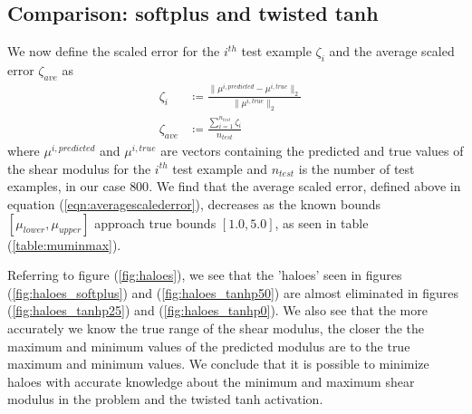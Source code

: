 \documentclass[12pt]{article}
\begin{document}
\subsection{\label{sect:compsofttanh} Comparison: softplus and twisted tanh}
We now define the scaled error for the $i^{th}$  test example $\zeta_{i}$ and the average scaled error $\zeta_{ave}$ as
\begin{subequations}
  \begin{align}
  \zeta_{i} &\coloneqq \frac{\|\mu^{i,predicted} - \mu^{i,true}\|_{2}}{\|\mu^{i,true}\|_{2}}  &\label{eqn:scalederror}\\
  \zeta_{ave} &\coloneqq \frac{\sum_{i=1}^{n_{test}}\zeta_{i}}{n_{test}} &\label{eqn:averagescalederror}
  \end{align}
\end{subequations}
where $\mu^{i,predicted}$ and $\mu^{i,true}$ are vectors containing the predicted and true values of the shear modulus for the $i^{th}$ test example and $n_{test}$ is the number of test examples, in our case $800$. We find that the average scaled error, defined above in equation (\ref{eqn:averagescalederror}), decreases as the known bounds $[\mu_{lower},\mu_{upper}]$ approach true bounds $[1.0,5.0]$, as seen in table (\ref{table:muminmax}).

Referring to figure (\ref{fig:haloes}), we see that the 'haloes' seen in figures (\ref{fig:haloes_softplus}) and (\ref{fig:haloes_tanhp50}) are almost eliminated in figures (\ref{fig:haloes_tanhp25}) and (\ref{fig:haloes_tanhp0}). We also see that the more accurately we know the true range of the shear modulus, the closer the the maximum and minimum values of the predicted modulus are to the true maximum and minimum values. We conclude that it is possible to minimize haloes with accurate knowledge about the minimum and maximum shear modulus in the problem and the twisted tanh activation.
\end{document}
